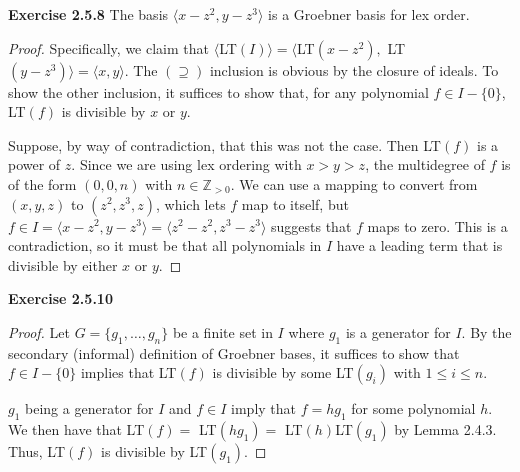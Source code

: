 \documentclass[12pt,oneside]{article}
\newenvironment{exercise}[1]{\vspace{.1in}\noindent\textbf{Exercise #1 \hspace{.05em}}}{}
\newcommand{\Z}{\mathbb{Z}}
\begin{document}
\begin{exercise}{2.5.8}
    The basis $\langle x-z^2,y-z^3\rangle$ is a Groebner basis for lex order. 
    \begin{proof}  
        Specifically, we claim that $\langle$LT$(I)\rangle=\langle$LT$(x-z^2),$ LT$(y-z^3)\rangle=\langle x,y \rangle$. The $(\supseteq)$ inclusion is obvious by 
        the closure of ideals. To show the other inclusion, it suffices to show that, for any
        polynomial $f \in I -\{0\}$, LT$(f)$ is divisible by $x$ or $y$. 
    
        Suppose, by way of 
        contradiction, that this was not the case. Then LT$(f)$ is a power of $z$. Since we 
        are using lex ordering with $x>y>z$, the multidegree of $f$ is of the form $(0,0,n)$ 
        with $n \in \Z_{>0}$. We can use a mapping to convert from $(x,y,z)$ to $(z^2,z^3,z)$,
        which lets $f$ map to itself, but 
        $f \in I = \langle x-z^2,y-z^3\rangle = \langle z^2-z^2,z^3-z^3\rangle$ suggests that
        $f$ maps to zero. This is a contradiction, so it must be that all polynomials in $I$ 
        have a leading term that is divisible by either $x$ or $y$.
    \end{proof}
\end{exercise}


\begin{exercise}{2.5.10}
    \begin{proof}
        Let $G = \{g_1,\ldots,g_n\}$ be a finite set in $I$ where $g_1$ is a generator 
        for $I$. By the secondary (informal) definition of Groebner bases, it suffices 
        to show that $f \in I -\{0\}$ implies that LT$(f)$ is divisible by some LT$(g_i)$ 
        with $1 \leq i \leq n$.
        
        $g_1$ being a generator for $I$ and $f \in I$ imply that $f = hg_1$ for some 
        polynomial $h$. We then have that LT$(f)=$ LT$(hg_1)=$ LT$(h)$LT$(g_1)$ by 
        Lemma 2.4.3. Thus, LT$(f)$ is divisible by LT$(g_1)$. 
    \end{proof}
\end{exercise}


\end{document}
